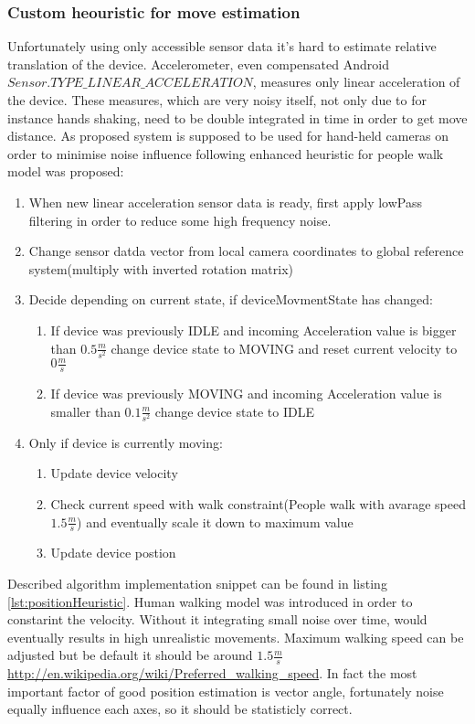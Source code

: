 \subsubsection{Custom heouristic for move estimation}
Unfortunately using only accessible sensor data it's hard to estimate relative translation of the device. Accelerometer, even compensated Android $Sensor.TYPE\_LINEAR\_ACCELERATION$, measures only linear acceleration of the device. These measures, which are very noisy itself, not only due to for instance hands shaking, need to be double integrated in time in order to get move distance. As proposed system is supposed to be used for hand-held cameras on order to minimise noise influence following enhanced heuristic for people walk model was proposed:
\begin{enumerate}
\item When new linear acceleration sensor data is ready, first apply lowPass filtering in order to reduce some high frequency noise.
\item Change sensor datda vector from local camera coordinates to global reference system(multiply with inverted rotation matrix)
\item Decide depending on current state, if deviceMovmentState has changed:
\begin{enumerate}
\item If device was previously IDLE and incoming Acceleration value is bigger than $0.5\frac{m}{s^2}$ change device state to MOVING and reset current velocity to $0\frac{m}{s}$
\item If device was previously MOVING and incoming Acceleration value is smaller than $0.1\frac{m}{s^2}$ change device state to IDLE
\end{enumerate}
\item Only if device is currently moving:
\begin{enumerate}
\item Update device velocity
\item Check current speed with walk constraint(People walk with avarage speed $1.5\frac{m}{s}$) and eventually scale it down to maximum value
\item Update device postion
\end{enumerate}
\end{enumerate}
Described algorithm implementation snippet can be found in listing \ref{lst:positionHeuristic}. Human walking model was introduced in order to constarint the velocity. Without it integrating small noise over time, would eventually results in high unrealistic movements. Maximum walking speed can be adjusted but be default it should be around $1.5\frac{m}{s}$ \url{http://en.wikipedia.org/wiki/Preferred_walking_speed}. In fact the most important factor of good position estimation is vector angle, fortunately noise equally influence each axes, so it should be statisticly correct.
